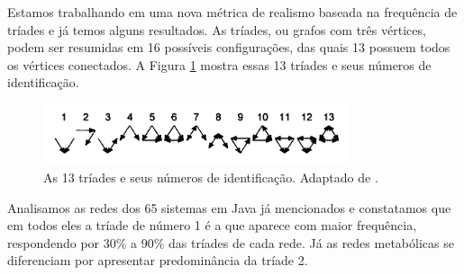 \documentclass[12pt]{article}
\begin{document}
Estamos trabalhando em uma nova métrica de realismo baseada na frequência de
tríades e já temos alguns resultados. As tríades, ou grafos com três vértices,
podem ser resumidas em 16 possíveis configurações, das quais 13 possuem todos
os vértices conectados. A Figura \ref{fig:triades} mostra essas 13 tríades e
seus números de identificação.

\begin{figure}
\centering
\includegraphics[width=0.8\textwidth]{triades} 
\caption{As 13 tríades e seus números de identificação. Adaptado de 
\cite{Milo2002}.} 
\label{fig:triades} 
\end{figure}

Analisamos as redes dos 65 sistemas em Java já mencionados e constatamos que em
todos eles a tríade de número 1 é a que aparece com maior frequência,
respondendo por 30\% a 90\% das tríades de cada rede. Já as redes metabólicas
\cite{Jeong2000} se diferenciam por apresentar predominância da tríade 2.

\renewcommand{\refname}{Referências Bibliográficas} 

\end{document}
